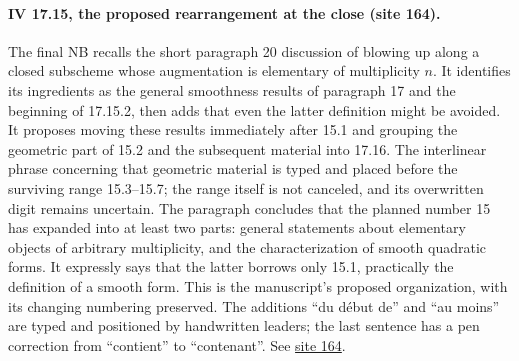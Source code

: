 \documentclass[10pt,a4paper]{article}
\begin{document}
\paragraph{IV 17.15, the proposed rearrangement at the close (site 164).}
The final NB recalls the short paragraph 20 discussion of blowing up along a closed subscheme whose augmentation is elementary of multiplicity $n$. It identifies its ingredients as the general smoothness results of paragraph 17 and the beginning of 17.15.2, then adds that even the latter definition might be avoided. It proposes moving these results immediately after 15.1 and grouping the geometric part of 15.2 and the subsequent material into 17.16. The interlinear phrase concerning that geometric material is typed and placed before the surviving range 15.3--15.7; the range itself is not canceled, and its overwritten digit remains uncertain. The paragraph concludes that the planned number 15 has expanded into at least two parts: general statements about elementary objects of arbitrary multiplicity, and the characterization of smooth quadratic forms. It expressly says that the latter borrows only 15.1, practically the definition of a smooth form. This is the manuscript's proposed organization, with its changing numbering preserved. The additions ``du début de'' and ``au moins'' are typed and positioned by handwritten leaders; the last sentence has a pen correction from ``contient'' to ``contenant''. See \href{https://grothendieck.umontpellier.fr/web/viewer.html?file=../25.pdf#page=165}{site 164}.
\par{}

\par{}
\end{document}
